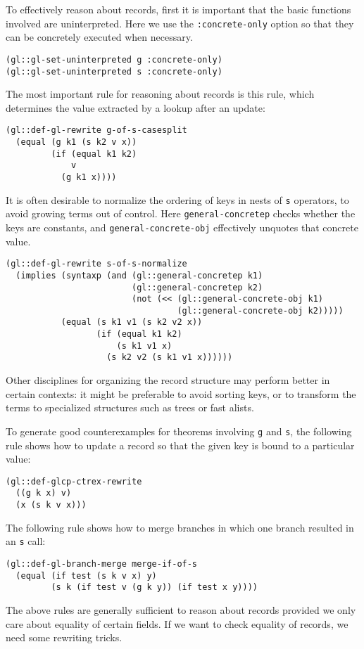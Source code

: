 \documentclass[submission,copyright,creativecommons]{eptcs}
\begin{document}
To effectively reason about records, first it is important that the
basic functions involved are uninterpreted.  Here we use the
\texttt{:concrete-only} option so that they can be concretely executed
when necessary.
\begin{verbatim}
(gl::gl-set-uninterpreted g :concrete-only)
(gl::gl-set-uninterpreted s :concrete-only)
\end{verbatim}
The most important rule for reasoning about records is this rule,
which determines the value extracted by a lookup after an update:
\begin{verbatim}
(gl::def-gl-rewrite g-of-s-casesplit
  (equal (g k1 (s k2 v x))
         (if (equal k1 k2)
             v
           (g k1 x))))
\end{verbatim}
It is often desirable to normalize the ordering of keys in nests of
\texttt{s} operators, to avoid growing terms out of control.  Here
\texttt{general-concretep} checks whether the keys are constants, and
\texttt{general-concrete-obj} effectively unquotes that concrete value.
\begin{verbatim}
(gl::def-gl-rewrite s-of-s-normalize
  (implies (syntaxp (and (gl::general-concretep k1)
                         (gl::general-concretep k2)
                         (not (<< (gl::general-concrete-obj k1)
                                  (gl::general-concrete-obj k2)))))
           (equal (s k1 v1 (s k2 v2 x))
                  (if (equal k1 k2)
                      (s k1 v1 x)
                    (s k2 v2 (s k1 v1 x))))))
\end{verbatim}
Other disciplines for organizing the record structure may perform
better in certain contexts: it might be preferable to avoid sorting
keys, or to transform the terms to specialized structures such as
trees or fast alists.

To generate good counterexamples for theorems involving \texttt{g} and
\texttt{s}, the following rule shows how to update a record so that
the given key is bound to a particular value:
\begin{verbatim}
(gl::def-glcp-ctrex-rewrite
  ((g k x) v)
  (x (s k v x)))
\end{verbatim}
The following rule shows how to merge branches in which one branch
resulted in an \texttt{s} call:
\begin{verbatim}
(gl::def-gl-branch-merge merge-if-of-s
  (equal (if test (s k v x) y)
         (s k (if test v (g k y)) (if test x y))))
\end{verbatim}
The above rules are generally sufficient to reason about records
provided we only care about equality of certain fields.  If we want to
check equality of records, we need some rewriting tricks.
\end{document}

